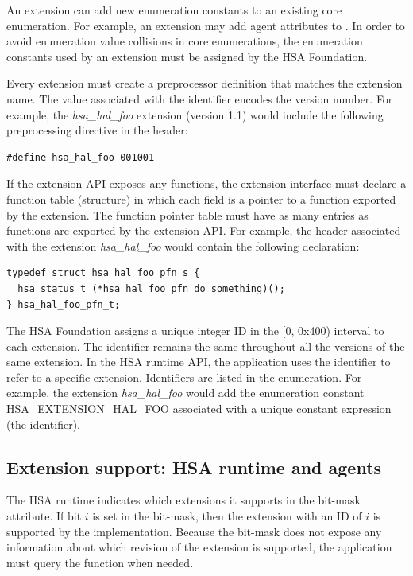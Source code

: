 \documentclass[final,oneside]{book}
\begin{document}
An extension can add new enumeration constants to an existing core
enumeration. For example, an extension may add agent attributes to
. In order to avoid enumeration value collisions in
core enumerations, the enumeration constants used by an extension must be
assigned by the HSA Foundation.

Every extension must create a preprocessor definition that matches the extension
name. The value associated with the identifier encodes the version number. For
example, the \textit{hsa_hal_foo} extension (version 1.1) would include the
following preprocessing directive in the header:
\begin{lstlisting}
#define hsa_hal_foo 001001
\end{lstlisting}

If the extension API exposes any functions, the extension interface must declare
a function table (structure) in which each field is a pointer to a
function exported by the extension. The function pointer table must have as many
entries as functions are exported by the extension API. For example, the header
associated with the extension \textit{hsa_hal_foo} would contain the following
declaration:
\begin{lstlisting}
typedef struct hsa_hal_foo_pfn_s {
  hsa_status_t (*hsa_hal_foo_pfn_do_something)();
} hsa_hal_foo_pfn_t;
\end{lstlisting}

The HSA Foundation assigns a unique integer ID in the [0, 0x400) interval to
each extension. The identifier remains the same throughout all the versions of
the same extension. In the HSA runtime API, the application uses the identifier
to refer to a specific extension. Identifiers are listed in the
 enumeration. For example, the extension
\textit{hsa_hal_foo} would add the enumeration constant HSA_EXTENSION_HAL_FOO
associated with a unique constant expression (the identifier).

\subsection{Extension support: HSA runtime and agents}

The HSA runtime indicates which extensions it supports in the
 bit-mask attribute. If bit $i$ is set in the
bit-mask, then the extension with an ID of $i$ is supported by the
implementation. Because the bit-mask does not expose any information about which
revision of the extension is supported, the application must query the function
 when needed.
\end{document}
